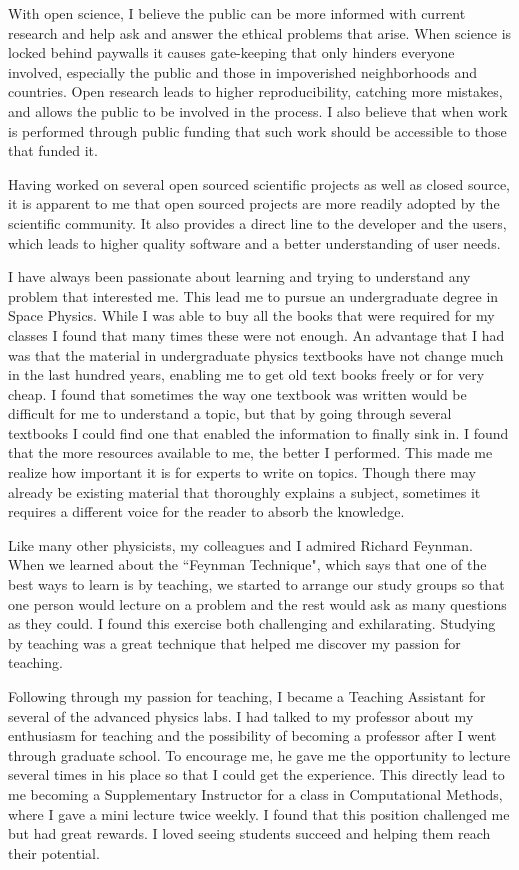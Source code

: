 \documentclass[12pt]{article}
\begin{document}
With open science, I believe the public can be more informed with current
research and help ask and answer the ethical problems that arise. When 
science is locked behind paywalls it causes gate-keeping that only hinders
everyone involved, especially the public and those in impoverished neighborhoods
and countries. Open research leads to higher reproducibility, catching more
mistakes, and allows the public to be involved in the process. I also believe
that when work is performed through public funding that such work should be
accessible to those that funded it.

Having worked on several open sourced scientific projects as well as closed
source, it is apparent to me that open sourced projects are more readily adopted
by the scientific community. It also provides a direct line to the developer and
the users, which leads to higher quality software and a better understanding of
user needs. 

I have always been passionate about learning and trying to understand any
problem that interested me. This lead me to pursue an undergraduate degree in
Space Physics. While I was able to buy all the books that were required for my
classes I found that many times these were not enough. An advantage that I had
was that the material in undergraduate physics textbooks have not change much in
the last hundred years, enabling me to get old text books freely or for very
cheap. I found that sometimes the way one textbook was written would be
difficult for me to understand a topic, but that by going through several
textbooks I could find one that enabled the information to finally sink in. I
found that the more resources available to me, the better I performed. This made
me realize how important it is for experts to write on topics. Though there may
already be existing material that thoroughly explains a subject, sometimes it
requires a different voice for the reader to absorb the knowledge.

Like many other physicists, my colleagues and I admired Richard Feynman. When we
learned about the ``Feynman Technique", which says that one of the best ways to
learn is by teaching, we started to arrange our study groups so that one person
would lecture on a problem and the rest would ask as many questions as they
could. I found this exercise both challenging and exhilarating. Studying by
teaching was a great technique that helped me discover my passion for teaching.

Following through my passion for teaching, I became a Teaching Assistant for
several of the advanced physics labs. I had talked to my professor about my
enthusiasm for teaching and the possibility of becoming a professor after I went
through graduate school. To encourage me, he gave me the opportunity to lecture
several times in his place so that I could get the experience. This directly
lead to me becoming a Supplementary Instructor for a class in Computational
Methods, where I gave a mini lecture twice weekly. I found that this position
challenged me but had great rewards. I loved seeing students succeed and helping
them reach their potential. 
\end{document}
